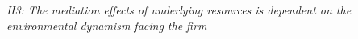 \emph{H3: The mediation effects of underlying resources is dependent on the environmental
dynamism facing the firm }











